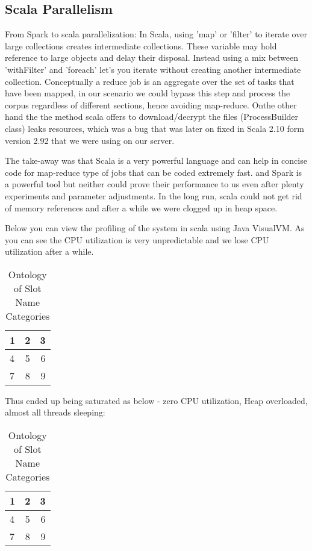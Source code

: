\subsection{Scala Parallelism}

From Spark to scala parallelization: In Scala, using 'map' or 'filter' to iterate over large collections creates intermediate collections. These variable may hold reference to large objects and delay their disposal. Instead using a mix between 'withFilter' and 'foreach' let's you iterate without creating another intermediate collection. Conceptually a reduce job is an aggregate over the set of tasks that have been mapped, in our scenario we could bypass this step and process the corpus regardless of different sections, hence avoiding map-reduce. Onthe other hand the the method scala offers to download/decrypt the files (ProcessBuilder class) leaks resources, which was a bug that was later on fixed in Scala 2.10 form version 2.92 that we were using on our server. 

The take-away was that Scala is a very powerful language and can help in concise code for map-reduce type of jobs that can be coded extremely fast. and Spark is a powerful tool but neither could prove their performance to us even after plenty experiments and parameter adjustments. In the long run, scala could not get rid of memory references and after a while we were clogged up in heap space.

Below you can view the profiling of the system in scala using Java VisualVM. As you can see the CPU utilization is very unpredictable and we lose CPU utilization after a while.
\begin{table}
\caption{Ontology of Slot Name Categories }
\centering
\begin{tabular}[c]{ |l| c |r| } \hline
  1 & 2 & 3 \\\hline
  4 & 5 & 6 \\\hline
  7 & 8 & 9 \\\hline
\end{tabular}
\end{table}

Thus ended up being saturated as below - zero CPU utilization, Heap overloaded, almost all threads sleeping:

\begin{table}
\caption{Ontology of Slot Name Categories }
\centering
\begin{tabular}[c]{ |l| c |r| } \hline
  1 & 2 & 3 \\\hline
  4 & 5 & 6 \\\hline
  7 & 8 & 9 \\\hline
\end{tabular}
\end{table}

